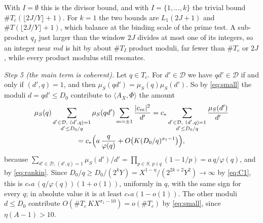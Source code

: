 \documentclass[11pt]{amsart}
\theoremstyle{remark}
\numberwithin{equation}{section}
\newcommand{\cD}{\mathcal{D}}
\begin{document}
With $I=\emptyset$ this is the divisor bound, and with $I=\{1,\dots,k\}$ the trivial bound $\#T_c(\lfloor2J/Y\rfloor+1)$. For $k=1$ the two bounds are $L_1(2J+1)$ and $\#T(\lfloor2J/Y\rfloor+1)$, which balance at the binding scale of the prime test. A sub-product $q_I$ just larger than the window $2J$ divides at most one of its integers, so an integer near $md$ is hit by about $\#T_I$ product moduli, far fewer than $\#T_c$ or $2J$, while every product modulus still resonates.

\emph{Step 5 (the main term is coherent).} Let $q\in T_c$. For $d'\in\cD$ we have $qd'\in\cD$ if and only if $(d',q)=1$, and then $\mu_S(qd')=\mu_S(q)\mu_S(d')$. So by \eqref{eq:small} the moduli $d=qd'\le D_0$ contribute to $\langle A_X,\Phi\rangle$ the amount
\begin{multline*}
\mu_S(q)\sum_{\substack{d'\in\cD,\ (d',q)=1\\ d'\le D_0/q}}\mu_S(qd')\sum_{m=\pm1}\frac{|c_m|^2}{d'}=c_*\sum_{\substack{d'\in\cD,\ (d',q)=1\\ d'\le D_0/q}}\frac{\mu_S(d')}{d'}\\
=c_*\Bigl(a\,\frac{q}{\varphi(q)}+O\bigl(K(D_0/q)^{\sigma_1-1}\bigr)\Bigr),
\end{multline*}
because $\sum_{d'\in\cD,\,(d',q)=1}\mu_S(d')/d'=\prod_{p\in S,\,p\nmid q}(1-1/p)=a\,q/\varphi(q)$, and by \eqref{eq:rankin}. Since $D_0/q\ge D_0/(2^kY)=X^{1-\eta}/(2^{2k+2}Y^2)\to\infty$ by \eqref{eq:C1}, this is $c_*a\,(q/\varphi(q))(1+o(1))$, uniformly in $q$, with the same sign for every $q$; in absolute value it is at least $c_*a(1-o(1))$. The other moduli $d\le D_0$ contribute $O(\#T_c\,KX^{\sigma_1-10})=o(\#T_c)$ by \eqref{eq:small}, since $\eta(A-1)>10$.
\end{document}
